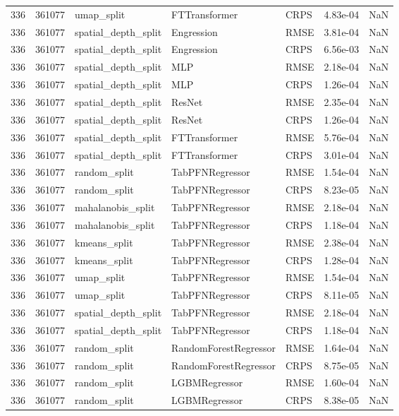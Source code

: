 \begin{tabular}{rrlllrr}
336 & 361077 & umap\_split & FTTransformer & CRPS & 4.83e-04 & NaN \\
336 & 361077 & spatial\_depth\_split & Engression & RMSE & 3.81e-04 & NaN \\
336 & 361077 & spatial\_depth\_split & Engression & CRPS & 6.56e-03 & NaN \\
336 & 361077 & spatial\_depth\_split & MLP & RMSE & 2.18e-04 & NaN \\
336 & 361077 & spatial\_depth\_split & MLP & CRPS & 1.26e-04 & NaN \\
336 & 361077 & spatial\_depth\_split & ResNet & RMSE & 2.35e-04 & NaN \\
336 & 361077 & spatial\_depth\_split & ResNet & CRPS & 1.26e-04 & NaN \\
336 & 361077 & spatial\_depth\_split & FTTransformer & RMSE & 5.76e-04 & NaN \\
336 & 361077 & spatial\_depth\_split & FTTransformer & CRPS & 3.01e-04 & NaN \\
336 & 361077 & random\_split & TabPFNRegressor & RMSE & 1.54e-04 & NaN \\
336 & 361077 & random\_split & TabPFNRegressor & CRPS & 8.23e-05 & NaN \\
336 & 361077 & mahalanobis\_split & TabPFNRegressor & RMSE & 2.18e-04 & NaN \\
336 & 361077 & mahalanobis\_split & TabPFNRegressor & CRPS & 1.18e-04 & NaN \\
336 & 361077 & kmeans\_split & TabPFNRegressor & RMSE & 2.38e-04 & NaN \\
336 & 361077 & kmeans\_split & TabPFNRegressor & CRPS & 1.28e-04 & NaN \\
336 & 361077 & umap\_split & TabPFNRegressor & RMSE & 1.54e-04 & NaN \\
336 & 361077 & umap\_split & TabPFNRegressor & CRPS & 8.11e-05 & NaN \\
336 & 361077 & spatial\_depth\_split & TabPFNRegressor & RMSE & 2.18e-04 & NaN \\
336 & 361077 & spatial\_depth\_split & TabPFNRegressor & CRPS & 1.18e-04 & NaN \\
336 & 361077 & random\_split & RandomForestRegressor & RMSE & 1.64e-04 & NaN \\
336 & 361077 & random\_split & RandomForestRegressor & CRPS & 8.75e-05 & NaN \\
336 & 361077 & random\_split & LGBMRegressor & RMSE & 1.60e-04 & NaN \\
336 & 361077 & random\_split & LGBMRegressor & CRPS & 8.38e-05 & NaN \\

\end{tabular}
